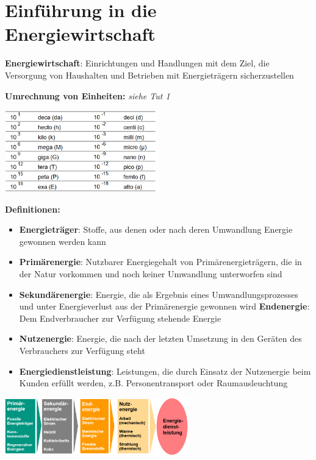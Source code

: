 \section{Einführung in die Energiewirtschaft}

\textbf{Energiewirtschaft}: Einrichtungen und Handlungen mit dem Ziel, die Versorgung von Haushalten und Betrieben mit Energieträgern sicherzustellen

\textbf{Umrechnung von Einheiten:} \textit{siehe Tut 1}
\begin{center}
	\includegraphics[width=0.5\textwidth]{images/units.png}
\end{center}

\textbf{Definitionen:}
\begin{itemize}
	\item \textbf{Energieträger}: Stoffe, aus denen oder nach deren Umwandlung Energie gewonnen werden kann
	\item \textbf{Primärenergie}: Nutzbarer Energiegehalt von Primärenergieträgern, die in der Natur vorkommen und noch keiner Umwandlung unterworfen sind
	\item \textbf{Sekundärenergie}: Energie, die als Ergebnis eines Umwandlungsprozesses und unter Energieverlust aus der Primärenergie gewonnen wird
	\textbf{Endenergie}: Dem Endverbraucher zur Verfügung stehende Energie
	\item \textbf{Nutzenergie}: Energie, die nach der letzten Umsetzung in den Geräten des Verbrauchers zur Verfügung steht
	\item \textbf{Energiedienstleistung}: Leistungen, die durch Einsatz der Nutzenergie beim Kunden erfüllt werden, z.B. Personentransport oder Raumausleuchtung
\end{itemize}
\begin{center}
	\includegraphics[width=0.6\textwidth]{images/energy-chain.png}
\end{center}